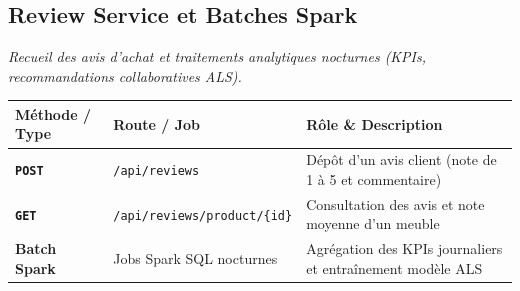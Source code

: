 \documentclass[10pt,a4paper]{article}
\begin{document}
\vspace{3pt}

\subsection{Review Service et Batches Spark}
\textit{Recueil des avis d'achat et traitements analytiques nocturnes (KPIs, recommandations collaboratives ALS).}

\begin{center}
\renewcommand{\arraystretch}{1.08}
\begin{tabularx}{\textwidth}{@{} l p{6.8cm} >{\raggedright\arraybackslash}X @{}}
\toprule[0.8pt]
\rowcolor{hdrcolor}
\textbf{Méthode / Type} & \textbf{Route / Job} & \textbf{Rôle \& Description} \\
\midrule
\textcolor{postgreen}{\texttt{\textbf{POST}}} & \texttt{/api/reviews} & Dépôt d'un avis client (note de 1 à 5 et commentaire) \\
\textcolor{syncblue}{\texttt{\textbf{GET}}}  & \texttt{/api/reviews/product/\{id\}} & Consultation des avis et note moyenne d'un meuble \\
\textcolor{asyncorange}{\textbf{Batch Spark}} & Jobs Spark SQL nocturnes & Agrégation des KPIs journaliers et entraînement modèle ALS \\
\bottomrule[0.8pt]
\end{tabularx}
\end{center}
\end{document}
